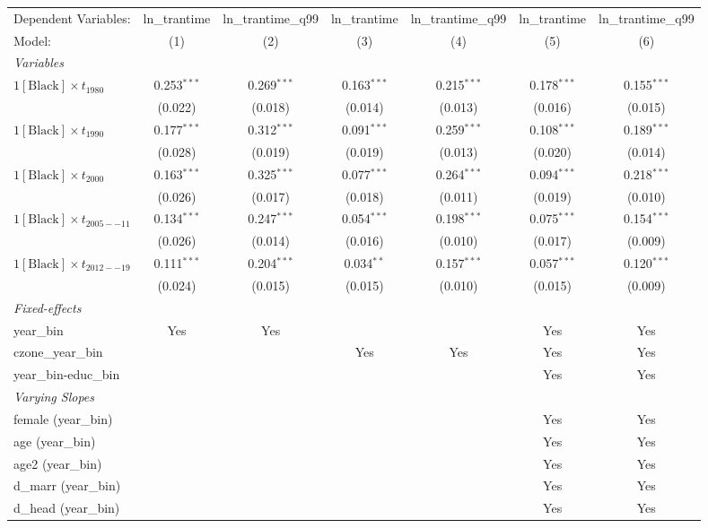 \begin{tabular}{lcccccc}
\tabularnewline\midrule\midrule
Dependent Variables:&ln\_trantime&ln\_trantime\_q99&ln\_trantime&ln\_trantime\_q99&ln\_trantime&ln\_trantime\_q99\\
Model:&(1) & (2) & (3) & (4) & (5) & (6)\\
\midrule \emph{Variables}&   &   &   &   &   &  \\
$1[\text{Black}] \times t_{1980}$ & 0.253$^{***}$ & 0.269$^{***}$ & 0.163$^{***}$ & 0.215$^{***}$ & 0.178$^{***}$ & 0.155$^{***}$\\
  &(0.022) & (0.018) & (0.014) & (0.013) & (0.016) & (0.015)\\
$1[\text{Black}] \times t_{1990}$ & 0.177$^{***}$ & 0.312$^{***}$ & 0.091$^{***}$ & 0.259$^{***}$ & 0.108$^{***}$ & 0.189$^{***}$\\
  &(0.028) & (0.019) & (0.019) & (0.013) & (0.020) & (0.014)\\
$1[\text{Black}] \times t_{2000}$ & 0.163$^{***}$ & 0.325$^{***}$ & 0.077$^{***}$ & 0.264$^{***}$ & 0.094$^{***}$ & 0.218$^{***}$\\
  &(0.026) & (0.017) & (0.018) & (0.011) & (0.019) & (0.010)\\
$1[\text{Black}] \times t_{2005--11}$ & 0.134$^{***}$ & 0.247$^{***}$ & 0.054$^{***}$ & 0.198$^{***}$ & 0.075$^{***}$ & 0.154$^{***}$\\
  &(0.026) & (0.014) & (0.016) & (0.010) & (0.017) & (0.009)\\
$1[\text{Black}] \times t_{2012--19}$ & 0.111$^{***}$ & 0.204$^{***}$ & 0.034$^{**}$ & 0.157$^{***}$ & 0.057$^{***}$ & 0.120$^{***}$\\
  &(0.024) & (0.015) & (0.015) & (0.010) & (0.015) & (0.009)\\
\midrule \emph{Fixed-effects}&   &   &   &   &   &  \\
year\_bin & Yes & Yes &  &  & Yes & Yes\\
czone\_year\_bin &  &  & Yes & Yes & Yes & Yes\\
year\_bin-educ\_bin &  &  &  &  & Yes & Yes\\
\midrule \emph{Varying Slopes}&   &   &   &   &   &  \\
female (year\_bin) &  &  &  &  & Yes & Yes\\
age (year\_bin) &  &  &  &  & Yes & Yes\\
age2 (year\_bin) &  &  &  &  & Yes & Yes\\
d\_marr (year\_bin) &  &  &  &  & Yes & Yes\\
d\_head (year\_bin) &  &  &  &  & Yes & Yes\\

\end{tabular}
